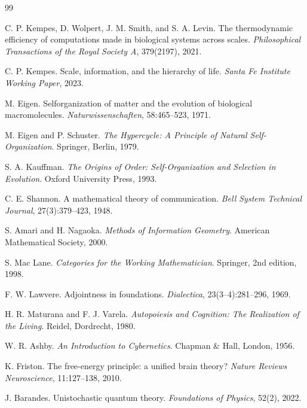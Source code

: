 \documentclass[11pt,oneside]{article}
\begin{document}
\begin{thebibliography}{99}

C. P. Kempes, D. Wolpert, J. M. Smith, and S. A. Levin.
\newblock The thermodynamic efficiency of computations made in biological systems across scales.
\newblock \emph{Philosophical Transactions of the Royal Society A}, 379(2197), 2021.

C. P. Kempes.
\newblock Scale, information, and the hierarchy of life.
\newblock \emph{Santa Fe Institute Working Paper}, 2023.

M. Eigen.
\newblock Selforganization of matter and the evolution of biological macromolecules.
\newblock \emph{Naturwissenschaften}, 58:465--523, 1971.

M. Eigen and P. Schuster.
\newblock \emph{The Hypercycle: A Principle of Natural Self-Organization}.
\newblock Springer, Berlin, 1979.

S. A. Kauffman.
\newblock \emph{The Origins of Order: Self-Organization and Selection in Evolution}.
\newblock Oxford University Press, 1993.

C. E. Shannon.
\newblock A mathematical theory of communication.
\newblock \emph{Bell System Technical Journal}, 27(3):379--423, 1948.

S. Amari and H. Nagaoka.
\newblock \emph{Methods of Information Geometry}.
\newblock American Mathematical Society, 2000.

S. Mac Lane.
\newblock \emph{Categories for the Working Mathematician}.
\newblock Springer, 2nd edition, 1998.

F. W. Lawvere.
\newblock Adjointness in foundations.
\newblock \emph{Dialectica}, 23(3–4):281–296, 1969.

H. R. Maturana and F. J. Varela.
\newblock \emph{Autopoiesis and Cognition: The Realization of the Living}.
\newblock Reidel, Dordrecht, 1980.

W. R. Ashby.
\newblock \emph{An Introduction to Cybernetics}.
\newblock Chapman \& Hall, London, 1956.

K. Friston.
\newblock The free-energy principle: a unified brain theory?
\newblock \emph{Nature Reviews Neuroscience}, 11:127--138, 2010.

J. Barandes.
\newblock Unistochastic quantum theory.
\newblock \emph{Foundations of Physics}, 52(2), 2022.


\end{thebibliography}
\end{document}
